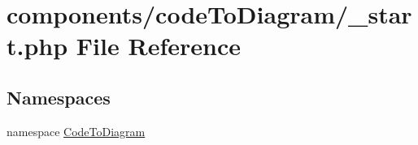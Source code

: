 \hypertarget{components_2code_to_diagram_2__start_8php}{
\section{components/codeToDiagram/\_\-start.php File Reference}
\label{components_2code_to_diagram_2__start_8php}
}
\subsection*{Namespaces}
\begin{CompactItemize}
\item 
namespace \hyperlink{namespace_code_to_diagram}{CodeToDiagram}
\end{CompactItemize}
